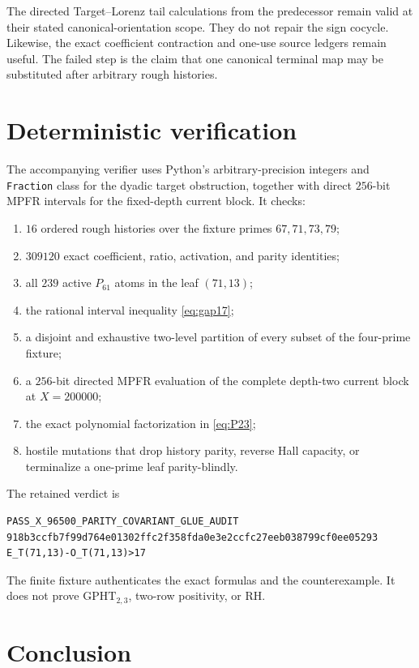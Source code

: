 \documentclass[11pt]{article}
\newcommand{\1}{\mathbf 1}
\newcommand{\GPHT}{\mathrm{GPHT}_{2,3}}
\newcommand{\code}[1]{\texttt{#1}}
\begin{document}
The directed Target--Lorenz tail calculations from the predecessor remain valid
at their stated canonical-orientation scope.  They do not repair the sign
cocycle.  Likewise, the exact coefficient contraction and one-use source
ledgers remain useful.  The failed step is the claim that one canonical
terminal map may be substituted after arbitrary rough histories.

\section{Deterministic verification}

The accompanying verifier uses Python's arbitrary-precision integers and
\code{Fraction} class for the dyadic target obstruction, together with direct
$256$-bit MPFR intervals for the fixed-depth current block.  It checks:

\begin{enumerate}[label=(\arabic*)]
\item $16$ ordered rough histories over the fixture primes
$67,71,73,79$;
\item $309120$ exact coefficient, ratio, activation, and parity identities;
\item all $239$ active $P_{61}$ atoms in the leaf $(71,13)$;
\item the rational interval inequality \eqref{eq:gap17};
\item a disjoint and exhaustive two-level partition of every subset of the
four-prime fixture;
\item a $256$-bit directed MPFR evaluation of the complete depth-two current
block at $X=200000$;
\item the exact polynomial factorization in \eqref{eq:P23};
\item hostile mutations that drop history parity, reverse Hall capacity, or
terminalize a one-prime leaf parity-blindly.
\end{enumerate}

The retained verdict is
\begin{verbatim}
PASS_X_96500_PARITY_COVARIANT_GLUE_AUDIT
918b3ccfb7f99d764e01302ffc2f358fda0e3e2ccfc27eeb038799cf0ee05293
E_T(71,13)-O_T(71,13)>17
\end{verbatim}
The finite fixture authenticates the exact formulas and the counterexample.  It
does not prove $\GPHT$, two-row positivity, or RH.

\section{Conclusion}
\end{document}
